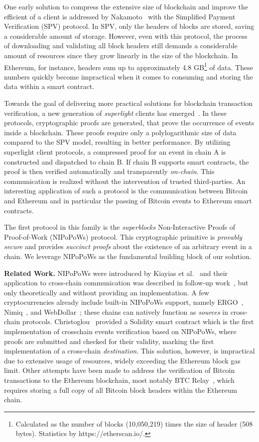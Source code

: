 One early solution to compress the extensive size of blockchain and improve the
efficient of a client is addressed by
Nakamoto~\cite{nakamoto} with the Simplified Payment Verification (SPV)
protocol. In SPV, only the headers of blocks are stored, saving a considerable
amount of storage.  However, even with this protocol, the process of
downloading and validating all block headers still demands a considerable
amount of resources since they grow linearly in the size of the blockchain.
In Ethereum, for instance, headers sum up to approximately 4.8
GB\footnote{Calculated as the number of blocks (10,050,219) times the size of
header (508 bytes). Statistics by https://etherscan.io/.} of data.
These numbers quickly become impractical when it comes to consuming and storing the
data within a smart contract.

Towards the goal of delivering more practical solutions for blockchain
transaction verification, a new generation of \emph{superlight}
clients has emerged~\cite{popow,nipopows,compactsuperblocks,flyclient}. In these
protocols, cryptographic proofs are generated, that prove the occurrence of
events inside a blockchain. These proofs require only a polylogarithmic size of
data compared to the SPV model, resulting in better performance. By utilizing
superlight client protocols, a compressed proof for an event in chain A is
constructed and dispatched to chain B. If chain B supports smart contracts, the
proof is then verified automatically and transparently \emph{on-chain}. This
communication is realized without the intervention of trusted third-parties.
An interesting application of such a protocol is the communication between
Bitcoin and Ethereum and in particular the passing of Bitcoin events to Ethereum
smart contracts.

The first protocol in this family is the \emph{superblocks} Non-Interactive
Proofs of Proof-of-Work (NIPoPoWs) protocol. This cryptographic primitive is \emph{provably secure} and
provides \emph{succinct proofs} about the existence of an arbitrary event
in a chain. We leverage NIPoPoWs as the fundamental building block of
our solution.

\noindent
\textbf{Related Work.} NIPoPoWs
were introduced by Kiayias et al.~\cite{nipopows} and their
application to cross-chain communication was described in follow-up
work~\cite{pow-sidechains}, but only theoretically and without providing
an implementation. A few cryptocurrencies already
include built-in NIPoPoWs support, namely ERGO~\cite{ergo}, Nimiq~\cite{nimiq}, and
WebDollar~\cite{webdollar}; these chains can natively function as \emph{sources}
in cross-chain protocols.
Christoglou~\cite{gglou} provided a Solidity smart contract which is the first
implementation of crosschain events verification based on NIPoPoWs, where
proofs are submitted and checked for their validity, marking the first
implementation of a cross-chain \emph{destination}. This solution, however, is
impractical due to extensive usage of resources, widely exceeding the Ethereum
block gas limit.
Other attempts have been made to address the verification of Bitcoin
transactions to the Ethereum blockchain, most notably BTC
Relay~\cite{btcrelay}, which requires storing a full copy of all Bitcoin
block headers within the Ethereum chain.


